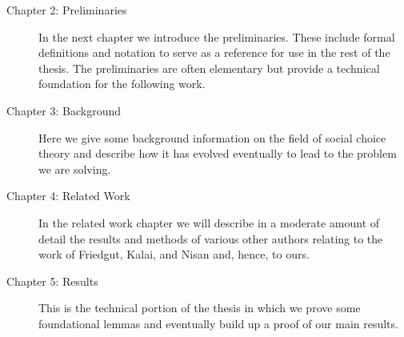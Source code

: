 	\begin{description}
		\item[Chapter 2: Preliminaries] In the next chapter we introduce the preliminaries. These include formal definitions and notation to serve as a reference for use in the rest of the thesis. The preliminaries are often elementary but provide a technical foundation for the following work.

		\item[Chapter 3: Background] Here we give some background information on the field of social choice theory and describe how it has evolved eventually to lead to the problem we are solving.

		\item[Chapter 4: Related Work] In the related work chapter we will describe in a moderate amount of detail the results and methods of various other authors relating to the work of Friedgut, Kalai, and Nisan and, hence, to ours.

		\item[Chapter 5: Results] This is the technical portion of the thesis in which we prove some foundational lemmas and eventually build up a proof of our main results.
	\end{description}
